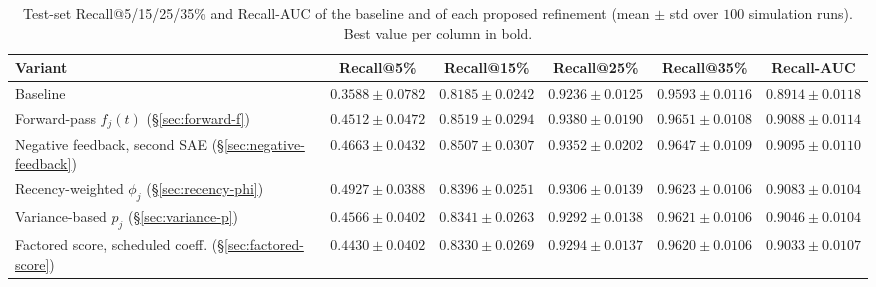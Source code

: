 \begin{table}[t]
\centering
\caption{Test-set Recall@5/15/25/35\% and Recall-AUC of the baseline and of each
proposed refinement (mean $\pm$ std over $100$ simulation runs). Best value per
column in bold.}
\label{tab:results}
\footnotesize
\setlength{\tabcolsep}{3pt}
\begin{tabular}{@{}lccccc@{}}
\toprule
Variant & Recall@5\% & Recall@15\% & Recall@25\% & Recall@35\% & Recall-AUC \\
\midrule
Baseline
  & $0.3588 \pm 0.0782$ & $0.8185 \pm 0.0242$ & $0.9236 \pm 0.0125$ & $0.9593 \pm 0.0116$ & $0.8914 \pm 0.0118$ \\
\midrule
Forward-pass $f_j(t)$ (\S\ref{sec:forward-f})
  & $0.4512 \pm 0.0472$ & $\mathbf{0.8519} \pm 0.0294$ & $\mathbf{0.9380} \pm 0.0190$ & $\mathbf{0.9651} \pm 0.0108$ & $0.9088 \pm 0.0114$ \\
Negative feedback, second SAE (\S\ref{sec:negative-feedback})
  & $0.4663 \pm 0.0432$ & $0.8507 \pm 0.0307$ & $0.9352 \pm 0.0202$ & $0.9647 \pm 0.0109$ & $\mathbf{0.9095} \pm 0.0110$ \\
Recency-weighted $\phi_j$ (\S\ref{sec:recency-phi})
  & $\mathbf{0.4927} \pm 0.0388$ & $0.8396 \pm 0.0251$ & $0.9306 \pm 0.0139$ & $0.9623 \pm 0.0106$ & $0.9083 \pm 0.0104$ \\
Variance-based $p_j$ (\S\ref{sec:variance-p})
  & $0.4566 \pm 0.0402$ & $0.8341 \pm 0.0263$ & $0.9292 \pm 0.0138$ & $0.9621 \pm 0.0106$ & $0.9046 \pm 0.0104$ \\
Factored score, scheduled coeff. (\S\ref{sec:factored-score})
  & $0.4430 \pm 0.0402$ & $0.8330 \pm 0.0269$ & $0.9294 \pm 0.0137$ & $0.9620 \pm 0.0106$ & $0.9033 \pm 0.0107$ \\
\bottomrule
\end{tabular}
\end{table}
